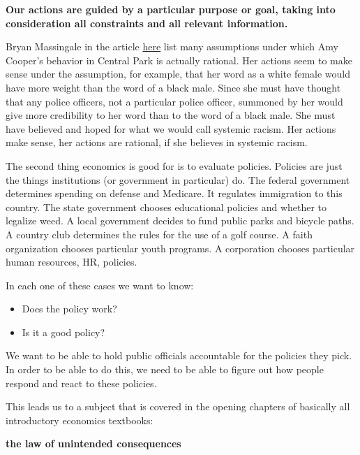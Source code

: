 \documentclass[
]{book}
\providecommand{\tightlist}{%
  \setlength{\itemsep}{0pt}\setlength{\parskip}{0pt}}
\begin{document}
\begin{center}
\textbf{Our actions are guided by a particular purpose or goal, taking into consideration all constraints and all relevant information.}

\end{center}

Bryan Massingale in the article \href{https://www.ncronline.org/news/opinion/assumptions-white-privilege-and-what-we-can-do-about-it}{here} list many assumptions under which Amy Cooper's behavior in Central Park is actually rational. Her actions seem to make sense under the assumption, for example, that her word as a white female would have more weight than the word of a black male. Since she must have thought that any police officers, not a particular police officer, summoned by her would give more credibility to her word than to the word of a black male. She must have believed and hoped for what we would call systemic racism. Her actions make sense, her actions are rational, if she believes in systemic racism.

The second thing economics is good for is to evaluate policies. Policies are just the things institutions (or government in particular) do. The federal government determines spending on defense and Medicare. It regulates immigration to this country. The state government chooses educational policies and whether to legalize weed. A local government decides to fund public parks and bicycle paths. A country club determines the rules for the use of a golf course. A faith organization chooses particular youth programs. A corporation chooses particular human resources, HR, policies.

In each one of these cases we want to know:

\begin{itemize}
\tightlist
\item
  Does the policy work?
\item
  Is it a good policy?
\end{itemize}

We want to be able to hold public officials accountable for the policies they pick. In order to be able to do this, we need to be able to figure out how people respond and react to these policies.

This leads us to a subject that is covered in the opening chapters of basically all introductory economics textbooks:

\begin{center}
\textbf{the law of unintended consequences}

\end{center}
\end{document}
